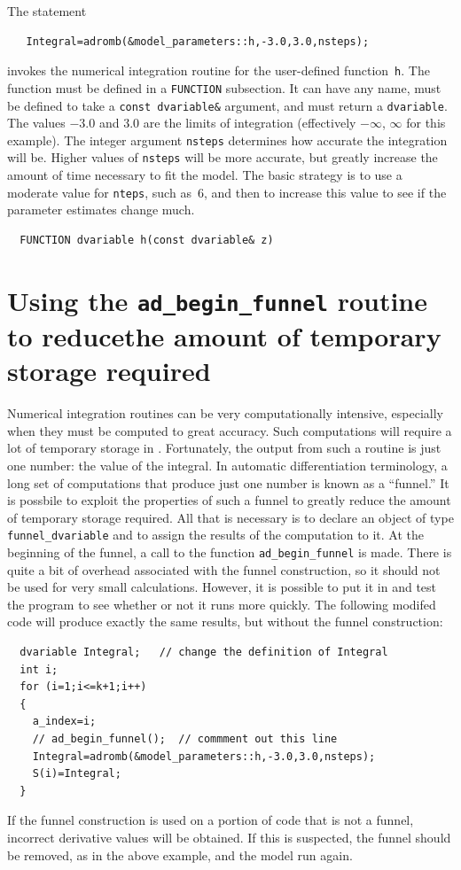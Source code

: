 \documentclass{admbmanual}
\begin{document}
The statement 
\begin{lstlisting}
   Integral=adromb(&model_parameters::h,-3.0,3.0,nsteps);
\end{lstlisting}
invokes the numerical integration routine for the user-defined
function~\texttt{h}. The function must be defined in a \texttt{FUNCTION}
subsection. It can have any name, must be defined to take a 
\texttt{const dvariable\&} argument, and must return a \texttt{dvariable}.
The values $-3.0$ and $3.0$ are the limits of integration (effectively
$-\infty$, $\infty$ for this example). The integer argument \texttt{nsteps}
determines how accurate the integration will be. Higher values of 
\texttt{nsteps} will be more accurate, but greatly increase the amount of
time necessary to fit the model. The basic strategy is to use a moderate
value for \texttt{nteps}, such as~6, and then to increase this value to see
if the parameter estimates change much.
\begin{lstlisting}
  FUNCTION dvariable h(const dvariable& z)
\end{lstlisting}


\section{Using the \texttt{ad\_begin\_funnel} routine to reduce\br the amount of temporary
storage required} 

Numerical integration routines can be very computationally intensive,
especially when they must be computed to great accuracy.
Such computations will require a lot of temporary storage in \ADM.
Fortunately, the output from such a routine is just one number: the
value of the integral. In automatic differentiation terminology,
a long set of computations that produce just one number is known
as a ``funnel.'' It is possbile to exploit the properties of such a
funnel to greatly reduce the amount of temporary storage required.
All that is necessary is to declare an object of type \texttt{funnel\_dvariable}
and to assign the results of the computation to it.  At the beginning
of the funnel, a call to the function \texttt{ad\_begin\_funnel} is
made. There is quite a bit of overhead associated with the funnel
construction, so it should not be used for very small calculations.
However, it is possible to put it in and test the program to
see whether or not it runs more quickly. The following  modifed
code will produce exactly the same results, but without the funnel
construction:
\begin{lstlisting}
  dvariable Integral;   // change the definition of Integral
  int i;
  for (i=1;i<=k+1;i++)
  {
    a_index=i;
    // ad_begin_funnel();  // commment out this line
    Integral=adromb(&model_parameters::h,-3.0,3.0,nsteps);
    S(i)=Integral;
  }
\end{lstlisting}
If the funnel construction is used on a portion of code that is
not a funnel, incorrect derivative values will be obtained.
If this is suspected, the funnel should be removed, as in the above
example, and the model run again.
\end{document}
